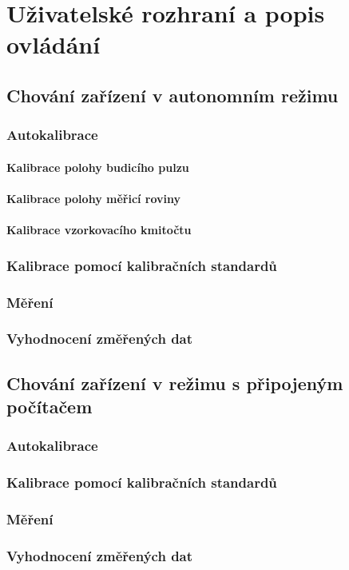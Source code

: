 \chapter{Uživatelské rozhraní a popis ovládání}

\section{Chování zařízení v autonomním režimu}

\subsection{Autokalibrace}

\subsubsection{Kalibrace polohy budicího pulzu}

\subsubsection{Kalibrace polohy měřicí roviny}

\subsubsection{Kalibrace vzorkovacího kmitočtu}

\subsection{Kalibrace pomocí kalibračních standardů}

\subsection{Měření}

\subsection{Vyhodnocení změřených dat}

\section{Chování zařízení v režimu s připojeným počítačem}

\subsection{Autokalibrace}

\subsection{Kalibrace pomocí kalibračních standardů}

\subsection{Měření}

\subsection{Vyhodnocení změřených dat}

